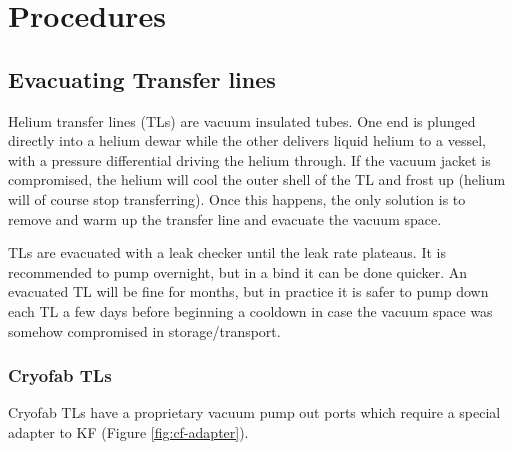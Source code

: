 \chapter{Procedures} 
\label{procedures}  
\section{Evacuating Transfer lines}
Helium transfer lines (TLs) are vacuum insulated tubes.  One end is plunged directly into a helium dewar while the other delivers liquid helium to a vessel, with a pressure differential driving the helium through.  If the vacuum jacket is compromised, the helium will cool the outer shell of the TL and frost up (helium will of course stop transferring).  Once this happens, the only solution is to remove and warm up the transfer line and evacuate the vacuum space.


TLs are evacuated with a leak checker until the leak rate plateaus.  It is recommended to pump overnight, but in a bind it can be done quicker.  An evacuated TL will be fine for months, but in practice it is safer to pump down each TL a few days before beginning a cooldown in case the vacuum space was somehow compromised in storage/transport.


\subsection{Cryofab TLs}

Cryofab TLs have a proprietary vacuum pump out ports which require a special adapter to KF (Figure \ref{fig:cf-adapter}).

